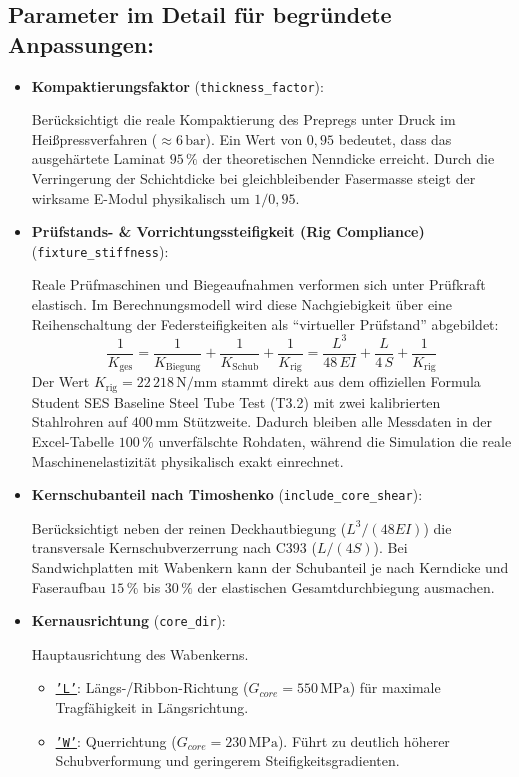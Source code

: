 \subsection*{Parameter im Detail für begründete Anpassungen:}

\begin{itemize}
    \item \textbf{Kompaktierungsfaktor} (\texttt{thickness\_factor}): \par
    Berücksichtigt die reale Kompaktierung des Prepregs unter Druck im Heißpressverfahren ($\approx 6\,\text{bar}$). Ein Wert von $0{,}95$ bedeutet, dass das ausgehärtete Laminat $95\,\%$ der theoretischen Nenndicke erreicht. Durch die Verringerung der Schichtdicke bei gleichbleibender Fasermasse steigt der wirksame E-Modul physikalisch um $1 / 0{,}95$.

    \item \textbf{Prüfstands- \& Vorrichtungssteifigkeit (Rig Compliance)} (\texttt{fixture\_stiffness}): \par
    Reale Prüfmaschinen und Biegeaufnahmen verformen sich unter Prüfkraft elastisch. Im Berechnungsmodell wird diese Nachgiebigkeit über eine Reihenschaltung der Federsteifigkeiten als "`virtueller Prüfstand"' abgebildet:
    \begin{equation}
        \frac{1}{K_{\text{ges}}} = \frac{1}{K_{\text{Biegung}}} + \frac{1}{K_{\text{Schub}}} + \frac{1}{K_{\text{rig}}} = \frac{L^3}{48 \, EI} + \frac{L}{4 \, S} + \frac{1}{K_{\text{rig}}}
    \end{equation}
    Der Wert $K_{\text{rig}} = 22\,218\,\text{N/mm}$ stammt direkt aus dem offiziellen Formula Student SES Baseline Steel Tube Test (T3.2) mit zwei kalibrierten Stahlrohren auf $400\,\text{mm}$ Stützweite. Dadurch bleiben alle Messdaten in der Excel-Tabelle $100\,\%$ unverfälschte Rohdaten, während die Simulation die reale Maschinenelastizität physikalisch exakt einrechnet.

    \item \textbf{Kernschubanteil nach Timoshenko} (\texttt{include\_core\_shear}): \par
    Berücksichtigt neben der reinen Deckhautbiegung ($L^3 / (48 EI)$) die transversale Kernschubverzerrung nach  C393 ($L / (4 S)$). Bei Sandwichplatten mit Wabenkern kann der Schubanteil je nach Kerndicke und Faseraufbau $15\,\%$ bis $30\,\%$ der elastischen Gesamtdurchbiegung ausmachen.

    \item \textbf{Kernausrichtung} (\texttt{core\_dir}): \par
    Hauptausrichtung des Wabenkerns.
    \begin{itemize}
        \item \hyperref[abk:L]{\texttt{'L'}}: Längs-/Ribbon-Richtung ($G_{core} = 550\,\text{MPa}$) für maximale Tragfähigkeit in Längsrichtung.
        \item \hyperref[abk:W]{\texttt{'W'}}: Querrichtung ($G_{core} = 230\,\text{MPa}$). Führt zu deutlich höherer Schubverformung und geringerem Steifigkeitsgradienten.
    \end{itemize}


\end{itemize}
